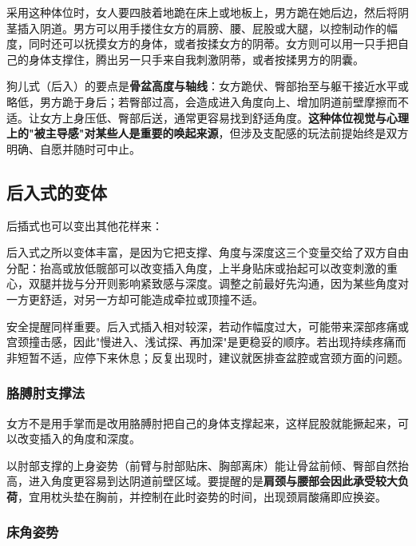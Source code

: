 \documentclass[12pt,UTF8]{ctexbook}
\begin{document}
采用这种体位时，女人要四肢着地跪在床上或地板上，男方跪在她后边，然后将阴茎插入阴道。男方可以用手搂住女方的肩膀、腰、屁股或大腿，以控制动作的幅度，同时还可以抚摸女方的身体，或者按揉女方的阴蒂。女方则可以用一只手把自己的身体支撑住，腾出另一只手来自我刺激阴蒂，或者按揉男方的阴囊。

\vspace{0.5em}

狗儿式（后入）的要点是\textbf{骨盆高度与轴线}：女方跪伏、臀部抬至与躯干接近水平或略低，男方跪于身后；若臀部过高，会造成进入角度向上、增加阴道前壁摩擦而不适。让女方上身压低、臀部后送，通常更容易找到舒适角度。\textbf{这种体位视觉与心理上的"被主导感"对某些人是重要的唤起来源}，但涉及支配感的玩法前提始终是双方明确、自愿并随时可中止。

\subsection{后入式的变体}

后插式也可以变出其他花样来：

\vspace{0.5em}

后入式之所以变体丰富，是因为它把支撑、角度与深度这三个变量交给了双方自由分配：抬高或放低髋部可以改变插入角度，上半身贴床或抬起可以改变刺激的重心，双腿并拢与分开则影响紧致感与深度。调整之前最好先沟通，因为某些角度对一方更舒适，对另一方却可能造成牵拉或顶撞不适。

安全提醒同样重要。后入式插入相对较深，若动作幅度过大，可能带来深部疼痛或宫颈撞击感，因此"慢进入、浅试探、再加深"是更稳妥的顺序。若出现持续疼痛而非短暂不适，应停下来休息；反复出现时，建议就医排查盆腔或宫颈方面的问题。

\subsubsection{胳膊肘支撑法}

女方不是用手掌而是改用胳膊肘把自己的身体支撑起来，这样屁股就能撅起来，可以改变插入的角度和深度。

\vspace{0.5em}

以肘部支撑的上身姿势（前臂与肘部贴床、胸部离床）能让骨盆前倾、臀部自然抬高，进入角度更容易到达阴道前壁区域。要提醒的是\textbf{肩颈与腰部会因此承受较大负荷}，宜用枕头垫在胸前，并控制在此时姿势的时间，出现颈肩酸痛即应换姿。

\subsubsection{床角姿势}
\end{document}
